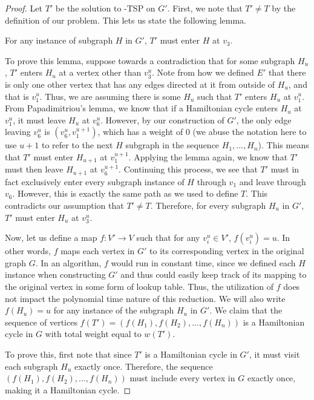 \begin{proof}
    Let $T'$ be the solution to \inob{}-TSP on $G'$. First, we note that $T' \neq T$ by the definition of our problem. This lets us state the following lemma.
\begin{lemma*}
    For any instance of subgraph $H$ in $G'$, $T'$ must enter $H$ at $v_3$.
\end{lemma*}
To prove this lemma, suppose towards a contradiction that for some subgraph $H_u$, $T'$ enters $H_u$ at a vertex other than $v_3^u$. Note from how we defined $E'$ that there is only one other vertex that has any edges directed at it from outside of $H_u$, and that is $v_1^u$. Thus, we are assuming there is some $H_u$ such that $T'$ enters $H_u$ at $v_1^u$. From Papadimitriou's lemma, we know that if a Hamiltonian cycle enters $H_u$ at $v_1^u$, it must leave $H_u$ at $v_6^u$. However, by our construction of $G'$, the only edge leaving $v_6^u$ is $(v_6^u, v_1^{u+1})$, which has a weight of $0$ (we abuse the notation here to use $u+1$ to refer to the next $H$ subgraph in the sequence $H_1,...,H_n$). This means that $T'$ must enter $H_{u+1}$ at $v_1^{u+1}$. Applying the lemma again, we know that $T'$ must then leave $H_{u+1}$ at $v_6^{u+1}$.  Continuing this process, we see that $T'$ must in fact exclusively enter every subgraph instance of $H$ through $v_1$ and leave through $v_6$. However, this is exactly the same path as we used to define $T$. This contradicts our assumption that $T' \neq T$. Therefore, for every subgraph $H_u$ in $G'$, $T'$ must enter $H_u$ at $v_3^u$.

Now, let us define a map $f: V' \rightarrow V$ such that for any $v_i^u \in V'$, $f(v_i^u) = u$. In other words, $f$ maps each vertex in $G'$ to its corresponding vertex in the original graph $G$. In an algorithm, $f$ would run in constant time, since we defined each $H$ instance when constructing $G'$ and thus could easily keep track of its mapping to the original vertex in some form of lookup table. Thus, the utilization of $f$ does not impact the polynomial time nature of this reduction. We will also write $f(H_u) = u$ for any instance of the subgraph $H_u$ in $G'$. We claim that the sequence of vertices $f(T') = (f(H_1), f(H_2), ..., f(H_n))$ is a Hamiltonian cycle in $G$ with total weight equal to $w(T')$.

To prove this, first note that since $T'$ is a Hamiltonian cycle in $G'$, it must visit each subgraph $H_u$ exactly once. Therefore, the sequence $(f(H_1), f(H_2), ..., f(H_n))$ must include every vertex in $G$ exactly once, making it a Hamiltonian cycle.


\end{proof}
